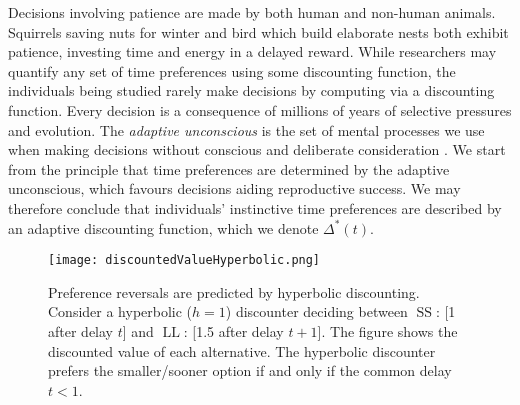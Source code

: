 \documentclass[titlepage, hidelinks, 12pt]{article}
\theoremstyle{plain}
\theoremstyle{remark}
\theoremstyle{definition}
\DeclareMathOperator{\smallersooner}{SS}
\DeclareMathOperator{\largerlater}{LL}
\DeclareMathOperator{\hyp}{hyp}
\begin{document}
%        

Decisions involving patience are made by both human and non-human animals. Squirrels saving nuts for winter and bird which build elaborate nests
both exhibit patience, investing time and energy in a delayed reward. While researchers may quantify any set of time preferences using
some discounting function, the individuals being studied rarely make decisions by computing via a discounting function. 
Every decision is a consequence of millions of years of selective pressures and evolution. The \textit{adaptive unconscious} is 
the set of mental processes we use when making decisions without conscious and deliberate consideration \cite{wegner02}. We start from the principle
that time preferences are determined by the adaptive unconscious,
which favours decisions aiding reproductive success. 
We may therefore conclude that individuals' instinctive time preferences are described by an adaptive discounting function, which we denote
$\Delta^*(t)$.


\begin{figure}[H]
    \centering
    \texttt{[image: discountedValueHyperbolic.png]}
    \caption[Graphical depiction of a preference reversal.]{Preference reversals are predicted by hyperbolic discounting. Consider a hyperbolic ($h = 1$) 
        discounter 
       deciding between $\smallersooner$: [1 after delay $t$] and $\largerlater$: [1.5 after delay $t+1$]. The figure shows the discounted value
    of each alternative. The hyperbolic discounter prefers the smaller/sooner option if and only if the common delay $t < 1$. }
\end{figure}
\end{document}
